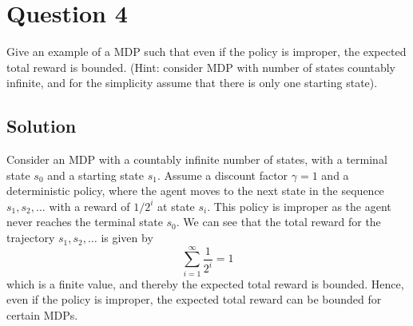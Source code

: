 \section*{Question 4}

Give an example of a MDP such that even if the policy is improper, the expected total reward is bounded.
(Hint: consider MDP with number of states countably infinite, and for the simplicity assume that there is only one starting state).

\subsection*{Solution}

Consider an MDP with a countably infinite number of states, with a terminal state \( s_0 \) and a starting state \( s_1 \).
Assume a discount factor \( \gamma = 1 \) and a deterministic policy, where the agent moves to the next state in the sequence \( s_1, s_2, \dots \) with a reward of \( 1/2^i \) at state \( s_i \).
This policy is improper as the agent never reaches the terminal state \( s_0 \).
We can see that the total reward for the trajectory \( s_1, s_2, \dots \) is given by
\[
    \sum_{i=1}^{\infty} \frac{1}{2^i} = 1
\]
which is a finite value, and thereby the expected total reward is bounded.
Hence, even if the policy is improper, the expected total reward can be bounded for certain MDPs.
